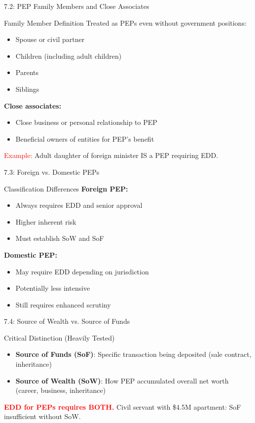 \documentclass{beamer}
\begin{document}
	\begin{frame}{7.2: PEP Family Members and Close Associates}
		\begin{block}{Family Member Definition}
			Treated as PEPs even without government positions:
			\begin{itemize}
				\item Spouse or civil partner
				\item Children (including adult children)
				\item Parents
				\item Siblings
			\end{itemize}
			\textbf{Close associates:}
			\begin{itemize}
				\item Close business or personal relationship to PEP
				\item Beneficial owners of entities for PEP's benefit
			\end{itemize}
		\end{block}
		\textcolor{red}{Example:} Adult daughter of foreign minister IS a PEP requiring EDD.
	\end{frame}
	
	\begin{frame}{7.3: Foreign vs. Domestic PEPs}
		\begin{block}{Classification Differences}
			\textbf{Foreign PEP:}
			\begin{itemize}
				\item Always requires EDD and senior approval
				\item Higher inherent risk
				\item Must establish SoW and SoF
			\end{itemize}
			\textbf{Domestic PEP:}
			\begin{itemize}
				\item May require EDD depending on jurisdiction
				\item Potentially less intensive
				\item Still requires enhanced scrutiny
			\end{itemize}
		\end{block}
	\end{frame}
	
	\begin{frame}{7.4: Source of Wealth vs. Source of Funds}
		\begin{block}{Critical Distinction (Heavily Tested)}
			\begin{itemize}
				\item \textbf{Source of Funds (SoF)}: Specific transaction being deposited (sale contract, inheritance)
				\item \textbf{Source of Wealth (SoW)}: How PEP accumulated overall net worth (career, business, inheritance)
			\end{itemize}
		\end{block}
		\textcolor{red}{\textbf{EDD for PEPs requires BOTH.}} Civil servant with \$4.5M apartment: SoF insufficient without SoW.
	\end{frame}
	
\end{document}
